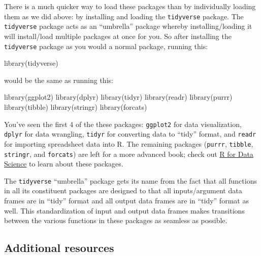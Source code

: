 \documentclass[
  letterpaper,
  DIV=11,
  numbers=noendperiod]{scrreprt}
\newenvironment{Shaded}{\begin{snugshade}}{\end{snugshade}}
\newcommand{\FunctionTok}[1]{\textcolor[rgb]{0.28,0.35,0.67}{#1}}
\newcommand{\NormalTok}[1]{\textcolor[rgb]{0.00,0.23,0.31}{#1}}
\theoremstyle{definition}
\theoremstyle{remark}
\begin{document}
There is a much quicker way to load these packages than by individually
loading them as we did above: by installing and loading the
\texttt{tidyverse} package. The \texttt{tidyverse} package acts as an
``umbrella'' package whereby installing/loading it will install/load
multiple packages at once for you. So after installing the
\texttt{tidyverse} package as you would a normal package, running this:

\begin{Shaded}
\begin{Highlighting}[]
\FunctionTok{library}\NormalTok{(tidyverse)}
\end{Highlighting}
\end{Shaded}

would be the same as running this:

\begin{Shaded}
\begin{Highlighting}[]
\FunctionTok{library}\NormalTok{(ggplot2)}
\FunctionTok{library}\NormalTok{(dplyr)}
\FunctionTok{library}\NormalTok{(tidyr)}
\FunctionTok{library}\NormalTok{(readr)}
\FunctionTok{library}\NormalTok{(purrr)}
\FunctionTok{library}\NormalTok{(tibble)}
\FunctionTok{library}\NormalTok{(stringr)}
\FunctionTok{library}\NormalTok{(forcats)}
\end{Highlighting}
\end{Shaded}

You've seen the first 4 of the these packages: \texttt{ggplot2} for data
visualization, \texttt{dplyr} for data wrangling, \texttt{tidyr} for
converting data to ``tidy'' format, and \texttt{readr} for importing
spreadsheet data into R. The remaining packages (\texttt{purrr},
\texttt{tibble}, \texttt{stringr}, and \texttt{forcats}) are left for a
more advanced book; check out \href{http://r4ds.had.co.nz/}{R for Data
Science} to learn about these packages.

The \texttt{tidyverse} ``umbrella'' package gets its name from the fact
that all functions in all its constituent packages are designed to that
all inputs/argument data frames are in ``tidy'' format and all output
data frames are in ``tidy'' format as well. This standardization of
input and output data frames makes transitions between the various
functions in these packages as seamless as possible.

\hypertarget{additional-resources-3}{%
\subsection{Additional resources}\label{additional-resources-3}}
\end{document}
